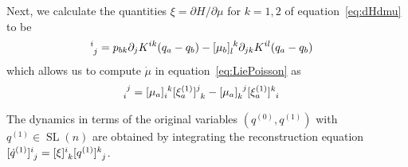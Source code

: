 \documentclass[12pt]{amsart}
\DeclareMathOperator{\SL}{SL}
\begin{document}
Next, we calculate the quantities $\xi = \partial H / \partial \mu$
for $k=1,2$ of equation~\eqref{eq:dHdmu} to be
\begin{align*}
  [\xi_a ]\indices{^i_j} &=
  p_{b k} \partial_j K^{i k}(q_a - q_b)
 -[\mu_b]\indices{_{l}^{k}} \partial_{j k} K^{i l}(q_a - q_b)
\end{align*}
which allows us to compute $\dot{\mu}$ in equation~\eqref{eq:LiePoisson} as
\begin{align*}
  [\dot{\mu}_a ]\indices{_i^j} &=
  [\mu_a]\indices{_i^k} [\xi_a^{(1)}]\indices{^j_k}
 -[\mu_a]\indices{_k^j} [\xi_a^{(1)}]\indices{^k_i}
\end{align*}

The dynamics in terms of the original variables $(q^{(0)},q^{(1)})$ with $q^{(1)} \in \SL(n)$ are obtained by integrating the reconstruction equation
$
  [\dot{q}^{(1)}]\indices{^i_j} =
  [\xi]\indices{^i_k} [q^{(1)}]\indices{^k_j}
$.



\end{document}
